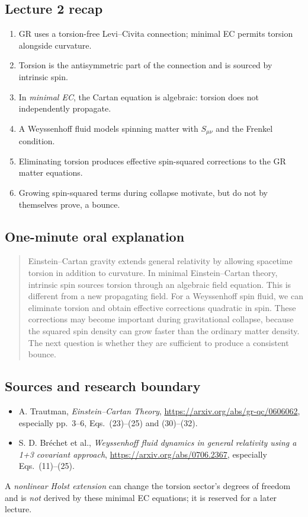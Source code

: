 \documentclass[11pt,a4paper]{article}
\begin{document}
\subsection{Lecture 2 recap}
\begin{enumerate}[leftmargin=*]
\item GR uses a torsion-free Levi--Civita connection; minimal EC permits torsion alongside curvature.
\item Torsion is the antisymmetric part of the connection and is sourced by intrinsic spin.
\item In \emph{minimal EC}, the Cartan equation is algebraic: torsion does not independently propagate.
\item A Weyssenhoff fluid models spinning matter with $S_{\mu\nu}$ and the Frenkel condition.
\item Eliminating torsion produces effective spin-squared corrections to the GR matter equations.
\item Growing spin-squared terms during collapse motivate, but do not by themselves prove, a bounce.
\end{enumerate}
\subsection{One-minute oral explanation}
\begin{quote}
Einstein--Cartan gravity extends general relativity by allowing spacetime torsion in addition to curvature. In minimal Einstein--Cartan theory, intrinsic spin sources torsion through an algebraic field equation. This is different from a new propagating field. For a Weyssenhoff spin fluid, we can eliminate torsion and obtain effective corrections quadratic in spin. These corrections may become important during gravitational collapse, because the squared spin density can grow faster than the ordinary matter density. The next question is whether they are sufficient to produce a consistent bounce.
\end{quote}
\subsection{Sources and research boundary}
\begin{itemize}
\item A. Trautman, \emph{Einstein--Cartan Theory}, \url{https://arxiv.org/abs/gr-qc/0606062}, especially pp.~3--6, Eqs.~(23)--(25) and (30)--(32).
\item S. D. Br\'echet et al., \emph{Weyssenhoff fluid dynamics in general relativity using a 1+3 covariant approach}, \url{https://arxiv.org/abs/0706.2367}, especially Eqs.~(11)--(25).
\end{itemize}
A \emph{nonlinear Holst extension} can change the torsion sector's degrees of freedom and is \emph{not} derived by these minimal EC equations; it is reserved for a later lecture.
\end{document}
